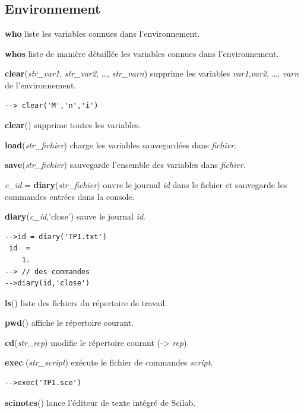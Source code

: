 \documentclass{article}
\begin{document}
\begin{multicols}{3}
\subsection*{Environnement}
\begin{description}
\item{\textbf{who}} liste les variables connues dans l'environnement.
\item{\textbf{whos}} liste de manière détaillée les variables connues dans l'environnement.      
\item{\textbf{clear}(\textit{str\_var1}, \textit{str\_var2}, \ldots, \textit{str\_varn})} supprime les variables \textit{var1},\textit{var2}, \ldots, \textit{varn} de l'environnement.
\begin{verbatim}--> clear('M','n','i')\end{verbatim}
\item{\textbf{clear}()} supprime toutes les variables.
\item{\textbf{load}(\textit{str\_fichier})} charge les variables sauvegardées dans \textit{fichier}.
\item{\textbf{save}(\textit{str\_fichier})} sauvegarde l'ensemble des variables dans \textit{fichier}.
\item{\textit{c\_id} = \textbf{diary}(\textit{str\_fichier})} ouvre le journal \textit{id} dans le fichier et sauvegarde les commandes entrées dans la console.
\item{\textbf{diary}(\textit{c\_id},'close')} sauve le journal \textit{id}.
\begin{verbatim}
-->id = diary('TP1.txt')
 id  =
    1.  
--> // des commandes
-->diary(id,'close')
\end{verbatim}
\item{\textbf{ls}()} liste des fichiers du répertoire de travail.
\item{\textbf{pwd}()} affiche le répertoire courant.
\item{\textbf{cd}(\textit{str\_rep})} modifie le répertoire courant (-> \textit{rep}).
\item{\textbf{exec} (\textit{str\_script})} exécute le fichier de commandes \textit{script}.
\begin{verbatim}
-->exec('TP1.sce')
\end{verbatim}
\item{\textbf{scinotes}()} lance l'éditeur de texte intégré de Scilab.
\end{description}

\end{multicols}
\end{document}
